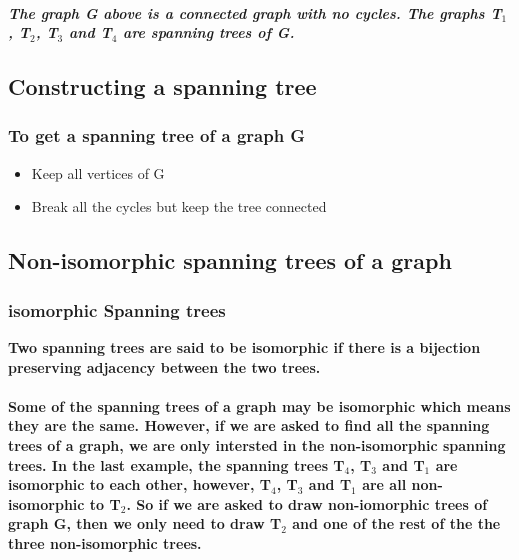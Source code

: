 \documentclass{article}
\begin{document}
\begin{center}
\end{center}

\subparagraph{The graph G above is a connected graph with no cycles. The graphs T$_1$, T$_2$, T$_3$ and T$_4$ are spanning trees of G.}

\subsection{Constructing a spanning tree}

\subsubsection{To get a spanning tree of a graph G}

\begin{itemize}
  \item Keep all vertices of G
  \item Break all the cycles but keep the tree connected
\end{itemize}

\subsection{Non-isomorphic spanning trees of a graph}

\subsubsection{isomorphic Spanning trees}

\textbf{Two spanning trees are said to be isomorphic if there is a bijection preserving adjacency between the two trees.}

\paragraph{Some of the spanning trees of a graph may be isomorphic which means they are the same. However, if we are asked to find all the spanning trees of a graph, we are only intersted in the non-isomorphic spanning trees. In the last example, the spanning trees T$_4$, T$_3$ and T$_1$ are isomorphic to each other, however, T$_4$, T$_3$ and T$_1$ are all non-isomorphic to T$_2$. So if we are asked to draw non-iomorphic trees of graph G, then we only need to draw T$_2$ and one of the rest of the the three non-isomorphic trees.}
\end{document}
